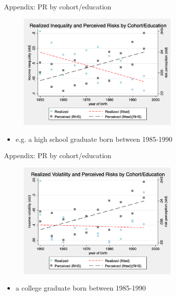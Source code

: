 \documentclass{beamer}
\begin{document}
\begin{frame}{Appendix: PR by cohort/education}
	\begin{figure}[ht]
		\label{appendix1:cohort_edu_compare_figure}
		\centering
		\includegraphics[width=0.7\textwidth]{figures/real_log_wage_shk_by_byear_5yr_edu_compare.png}
	\end{figure}
	\begin{itemize}
		\item e.g. a high school graduate born between 1985-1990  \quad  \hyperlink{cohort_compare}{} 
	\end{itemize}
\end{frame}


\begin{frame}{Appendix: PR by cohort/education}
	\begin{figure}[ht]
		\label{appendix2:cohort_edu_compare_figure}
		\centering
		\includegraphics[width=0.7\textwidth]{figures/real_log_wage_shk_gr_by_byear_5yr_edu_compare.png}
	\end{figure}
	\begin{itemize}
		\item a college graduate born between 1985-1990  \quad  \hyperlink{cohort_compare}{} 
	\end{itemize}
\end{frame}
\end{document}
